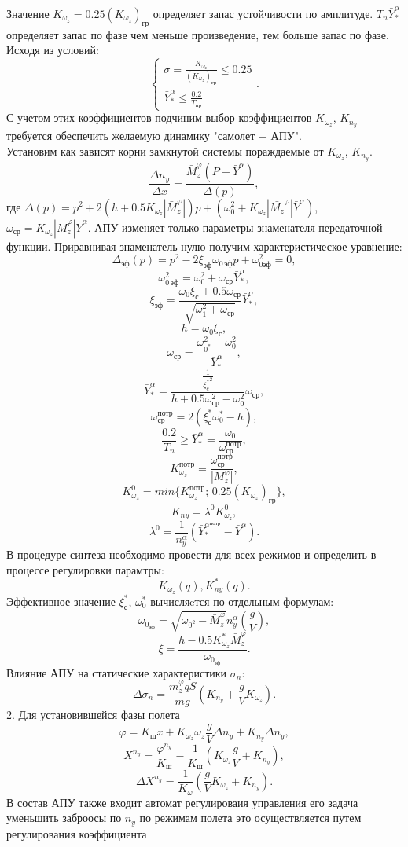 \documentclass{article}
\begin{document}
Значение $K_{\omega_z} = 0.25(K_{\omega_z})_\text{гр}$ определяет запас устойчивости по амплитуде. $T_n \bar{Y}_*^\alpha$ определяет запас по фазе чем меньше произведение, тем больше запас по фазе.
Исходя из условий:
\[
	\begin{cases}
		\sigma = \frac{K_{\omega_z}}{(K_{\omega_z})_\text{гр}} \leq 0.25 \\
		\bar{Y}_*^\alpha \leq \frac{0.2}{T_\text{пр}}
	\end{cases}.
\]
С учетом этих коэффициентов подчиним выбор коэффициентов $K_{\omega_z}$, $K_{n_y}$ требуется обеспечить желаемую динамику "самолет + АПУ".\\
Установим как зависят корни замкнутой системы пораждаемые от $K_{\omega_z}$, $K_{n_y}$.
\[
	\frac{\Delta n_y}{\Delta x} = \frac{\bar{M}_z^\varphi (P + \bar{Y}^\alpha)}{\Delta(p)},
\]
где $\Delta(p) = p^2 + 2(h+0.5 K_{\omega_z} |\bar{M}_z^\varphi|)p + (\omega_0^2 + K_{\omega_z}|\bar{M_z}^\varphi|\bar{Y}^\alpha)$, $\omega_\text{ср} = K_{\omega_z} |\bar{M}_z^\varphi| \bar{Y}^\alpha$.
АПУ изменяет только параметры знаменателя передаточной функции.
Приравнивая знаменатель нулю получим характеристическое уравнение:
\[
	\Delta_\text{эф}(p)= p^2 - 2 \xi_\text{эф}\omega_{0 \, \text{эф}}p + \omega_{0 \text{эф}}^2 = 0, 
\]
\[
	\omega_{0 \, \text{эф}}^2 = \omega_0^2 + \omega_\text{ср}\bar{Y}^\alpha_*,
\]
\[
	\xi_\text{эф} = \frac{\omega_0 \xi_\text{с} +0.5\omega_\text{ср}}{\sqrt{\omega_1^2 + \omega_\text{ср}}} \bar{Y}^{\alpha}_* ,
\]
\[
	h = \omega_0 \xi_\text{с},
\]
\[
	\omega_\text{ср}= \frac{\omega_{0^*}^2 - \omega_0^2}{\bar{Y}^{\alpha}_*},
\]
\[
	\bar{Y}^{\alpha}_* = \frac{\frac{1}{{\xi_c^*}^2}}{h + 0.5 \omega_\text{ср}^2- \omega_0^2}{\omega_\text{ср}},
\]
\[
	\omega_\text{ср}^{\text{потр}} = 2(\xi_\text{с}^* \omega_0^* - h),
\]
\[
	\frac{0.2}{T_n} \geq \bar{Y}^{\alpha}_* = \frac{\omega_0}{\omega_\text{ср}^{\text{потр}}},
\]
\[
	K_{\omega_z}^{\text{потр}} = \frac{\omega_\text{ср}^{\text{потр}}}{|M_z^{\varphi}|},
\]
\[
	K_{\omega_z}^0 = min\{K_{\omega_z}^{\text{потр}}; \, 0.25(K_{\omega_z})_\text{гр}\},
\]
\[
	K_{ny}= \lambda^0 K^0_{\omega_z},
\]
\[
	\lambda^0 = \frac{1}{n_y^\alpha}(\bar{Y}^{\alpha^{\text{потр}}}_* - \bar{Y}^\alpha).
\]
В процедуре синтеза необходимо провести для всех режимов и определить в процессе регулировки парамтры:
\[
	K_{\omega_z}(q), K_{ny}^*(q).
\]
Эффективное значение $\xi_\text{с}^*$, $\omega_0^*$ вычисляeтся по отдельным формулам:
\[
	\omega_{0_\text{эф}} = \sqrt{\omega_{0^{2}} -\bar{M}_z^{\varphi}} n_y^{\alpha}(\frac{g}{V}),
\]
\[
	\xi = \frac{h - 0.5 K_{\omega_z}^* \bar{M}_z^{\varphi}}{\omega_{0_\text{эф}}}.
\]
Влияние АПУ на статические характеристики $\sigma_n$:
\[
	\Delta \sigma_n = \frac{m_z^\varphi q S}{mg}(K_{n_y} + \frac{g}{V}K_{\omega_z}).
\]
2. Для установившейся фазы полета 
\[
	\varphi = K_\text{ш}x + K_{\omega_z} \omega_z \frac{g}{V}\Delta n_y + K_{n_y} \Delta n_y,
\]
\[
	X^{n_y} = \frac{\varphi^{n_y}}{K_\text{ш}} - \frac{1}{K_\text{ш}} (K_{\omega_z} \frac{g}{V} + K_{n_y}),
\]
\[
	\Delta X^{n_y}= \frac{1}{K_\omega} (\frac{g}{V} K_{\omega_z}+ K_{n_y}).
\]
В состав АПУ также входит автомат регулироваия управления его задача уменьшить заброосы по $n_y$ по режимам полета это осуществляется путем регулирования коэффициента 
\end{document}
